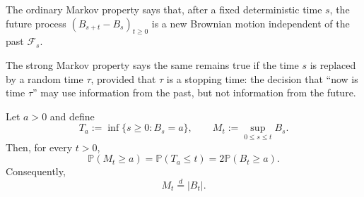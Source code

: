 \begin{remark}[Interpretation]
The ordinary Markov property says that, after a fixed deterministic time
$s$, the future process $(B_{s+t}-B_s)_{t\ge0}$ is a new Brownian motion
independent of the past $\mathcal{F}_s$.

The strong Markov property says the same remains true if the time $s$ is
replaced by a random time $\tau$, provided that $\tau$ is a stopping time:
the decision that ``now is time $\tau$'' may use information from the past,
but not information from the future.
\end{remark}

\begin{theorem}
Let $a>0$ and define
\[
T_a:=\inf\{s\ge0:B_s=a\},
\qquad
M_t:=\sup_{0\le s\le t}B_s.
\]
Then, for every $t>0$,
\[
\mathbb{P}(M_t\ge a)
=
\mathbb{P}(T_a\le t)
=
2\mathbb{P}(B_t\ge a).
\]
Consequently,
\[
M_t\overset{d}{=}|B_t|.
\]
\end{theorem}

